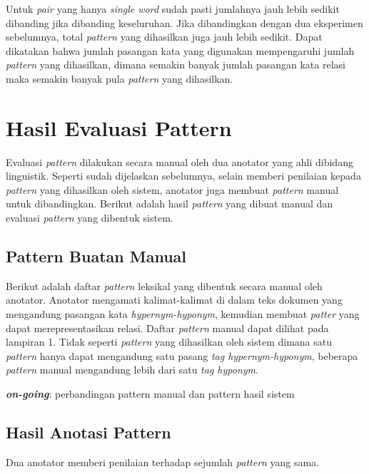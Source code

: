 \noindent Untuk \textit{pair} yang hanya \textit{single word} sudah pasti jumlahnya jauh lebih sedikit dibanding jika dibanding keseluruhan. Jika dibandingkan dengan dua eksperimen sebelumnya, total \textit{pattern} yang dihasilkan juga jauh lebih sedikit. Dapat dikatakan bahwa jumlah pasangan kata yang digunakan mempengaruhi jumlah \textit{pattern} yang dihasilkan, dimana semakin banyak jumlah pasangan kata relasi maka semakin banyak pula \textit{pattern} yang dihasilkan.


\section{Hasil Evaluasi Pattern}
Evaluasi \textit{pattern} dilakukan secara manual oleh dua anotator yang ahli dibidang linguistik. Seperti sudah dijelaskan sebelumnya, selain memberi penilaian kepada \textit{pattern} yang dihasilkan oleh sistem, anotator juga membuat \textit{pattern} manual untuk dibandingkan. Berikut adalah hasil \textit{pattern} yang dibuat manual dan evaluasi \textit{pattern} yang dibentuk sistem.

\subsection{Pattern Buatan Manual}
Berikut adalah daftar \textit{pattern} leksikal yang dibentuk secara manual oleh anotator. Anotator mengamati kalimat-kalimat di dalam teks dokumen yang mengandung pasangan kata \textit{hypernym-hyponym}, kemudian membuat \textit{patter} yang dapat merepresentasikan relasi. Daftar \textit{pattern} manual dapat dilihat pada lampiran 1. Tidak seperti \textit{pattern} yang dihasilkan oleh sistem dimana satu \textit{pattern} hanya dapat mengandung satu pasang \textit{tag hypernym-hyponym}, beberapa \textit{pattern} manual mengandung lebih dari satu \textit{tag hyponym}.

\noindent \textbf{\textit{on-going}}: perbandingan pattern manual dan pattern hasil sistem

\subsection{Hasil Anotasi Pattern}
Dua anotator memberi penilaian terhadap sejumlah \textit{pattern} yang sama. 

